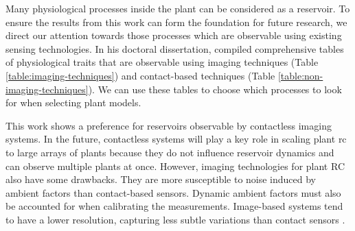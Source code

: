 
Many physiological processes inside the plant can be considered as a reservoir.
To ensure the results from this work can form the foundation for future research, we direct our attention towards those processes which are observable using existing sensing technologies.
In his doctoral dissertation, \citet{pieters_reservoir_2022} compiled comprehensive tables of physiological traits that are observable using imaging techniques (Table \ref{table:imaging-techniques}) and contact-based techniques (Table \ref{table:non-imaging-techniques}).
We can use these tables to choose which processes to look for when selecting plant models.

This work shows a preference for reservoirs observable by contactless imaging systems.
In the future, contactless systems will play a key role in scaling plant \acrshort{rc} to large arrays of plants because they do not influence reservoir dynamics and can observe multiple plants at once.
However, imaging technologies for plant RC also have some drawbacks.
They are more susceptible to noise induced by ambient factors than contact-based sensors.
Dynamic ambient factors must also be accounted for when calibrating the measurements.
Image-based systems tend to have a lower resolution, capturing less subtle variations than contact sensors \citep{pieters_reservoir_2022}.



